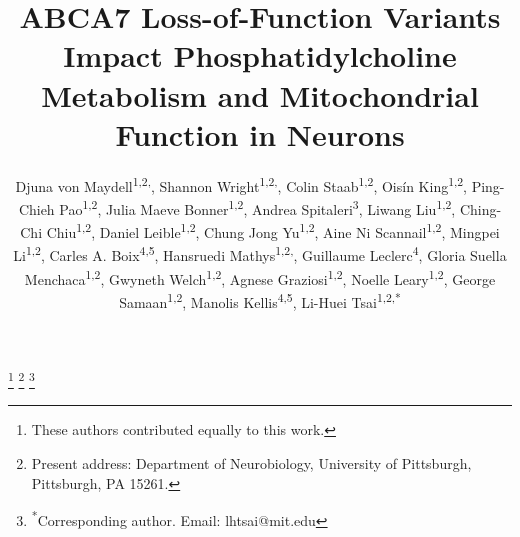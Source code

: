 \title{ABCA7 Loss-of-Function Variants Impact Phosphatidylcholine Metabolism and Mitochondrial Function in Neurons}

\author{%
  \parbox{\textwidth}{%
    Djuna von Maydell\textsuperscript{1,2,\textdagger}, 
    Shannon Wright\textsuperscript{1,2,\textdagger}, 
    Colin Staab\textsuperscript{1,2}, 
    Ois\'{i}n King\textsuperscript{1,2}, 
    Ping-Chieh Pao\textsuperscript{1,2}, 
    Julia Maeve Bonner\textsuperscript{1,2}, 
    Andrea Spitaleri\textsuperscript{3}, 
    Liwang Liu\textsuperscript{1,2}, 
    Ching-Chi Chiu\textsuperscript{1,2}, 
    Daniel Leible\textsuperscript{1,2}, 
    Chung Jong Yu\textsuperscript{1,2}, 
    Aine Ni Scannail\textsuperscript{1,2}, 
    Mingpei Li\textsuperscript{1,2}, 
    Carles A. Boix\textsuperscript{4,5}, 
    Hansruedi Mathys\textsuperscript{1,2,\textdaggerdbl}, 
    Guillaume Leclerc\textsuperscript{4}, 
    Gloria Suella Menchaca\textsuperscript{1,2}, 
    Gwyneth Welch\textsuperscript{1,2}, 
    Agnese Graziosi\textsuperscript{1,2}, 
    Noelle Leary\textsuperscript{1,2}, 
    George Samaan\textsuperscript{1,2}, 
    Manolis Kellis\textsuperscript{4,5}, 
    Li-Huei Tsai\textsuperscript{1,2,*}
  }%
}

\date{}
\maketitle


\thanks{\textsuperscript{\textdagger}These authors contributed equally to this work.}
\thanks{\textsuperscript{\textdaggerdbl}Present address: Department of Neurobiology, University of Pittsburgh, Pittsburgh, PA 15261.}
\thanks{\textsuperscript{*}Corresponding author. Email: lhtsai@mit.edu}



 